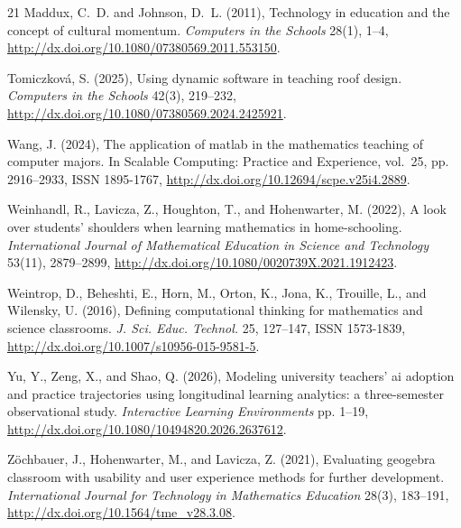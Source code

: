 \documentclass[a4paper,12pt]{article}
\begin{document}
\begin{thebibliography}{21}
Maddux, C.~D. and Johnson, D.~L. (2011), Technology in education and the
  concept of cultural momentum. \emph{Computers in the Schools} 28(1), 1--4,
  \urlprefix\url{http://dx.doi.org/10.1080/07380569.2011.553150}.

Tomiczkov\'{a}, S. (2025), Using dynamic software in teaching roof design.
  \emph{Computers in the Schools} 42(3), 219--232,
  \urlprefix\url{http://dx.doi.org/10.1080/07380569.2024.2425921}.

Wang, J. (2024), The application of matlab in the mathematics teaching of
  computer majors. In Scalable Computing: Practice and Experience, vol.~25, pp.
  2916--2933, ISSN 1895-1767,
  \urlprefix\url{http://dx.doi.org/10.12694/scpe.v25i4.2889}.

Weinhandl, R., Lavicza, Z., Houghton, T., and Hohenwarter, M. (2022), A look
  over students' shoulders when learning mathematics in home-schooling.
  \emph{International Journal of Mathematical Education in Science and
  Technology} 53(11), 2879--2899,
  \urlprefix\url{http://dx.doi.org/10.1080/0020739X.2021.1912423}.

Weintrop, D., Beheshti, E., Horn, M., Orton, K., Jona, K., Trouille, L., and
  Wilensky, U. (2016), Defining computational thinking for mathematics and
  science classrooms. \emph{J. Sci. Educ. Technol.} 25, 127--147, ISSN
  1573-1839, \urlprefix\url{http://dx.doi.org/10.1007/s10956-015-9581-5}.

Yu, Y., Zeng, X., and Shao, Q. (2026), Modeling university teachers' ai
  adoption and practice trajectories using longitudinal learning analytics: a
  three-semester observational study. \emph{Interactive Learning Environments}
  pp. 1--19, \urlprefix\url{http://dx.doi.org/10.1080/10494820.2026.2637612}.

Z\"{o}chbauer, J., Hohenwarter, M., and Lavicza, Z. (2021), Evaluating geogebra
  classroom with usability and user experience methods for further development.
  \emph{International Journal for Technology in Mathematics Education} 28(3),
  183--191, \urlprefix\url{http://dx.doi.org/10.1564/tme_v28.3.08}.

\end{thebibliography}
\end{document}
